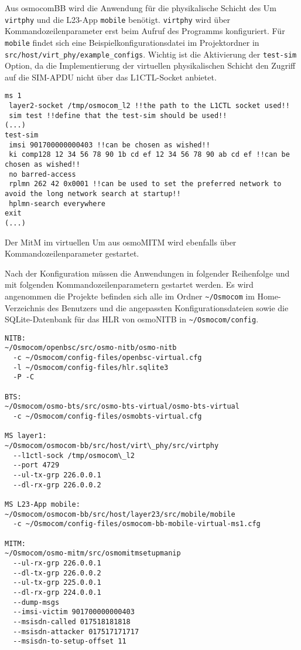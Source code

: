 Aus osmocomBB wird die Anwendung für die physikalische Schicht des \ac{Um} \texttt{virtphy} und die L23-App \texttt{mobile} benötigt. \texttt{virtphy} wird über Kommandozeilenparameter erst beim Aufruf des Programms konfiguriert. Für \texttt{mobile} findet sich eine Beispielkonfigurationsdatei im Projektordner in \texttt{src/host/virt\_phy/example\_configs}. Wichtig ist die Aktivierung der \texttt{test-sim} Option, da die Implementierung der virtuellen physikalischen Schicht den Zugriff auf die \ac{SIM}-\ac{APDU} nicht über das \ac{L1CTL}-Socket anbietet.\\

\begin{lstlisting}[boxpos=c, frame=single, language=bytetxt, numbers=none, basicstyle=\tiny\ttfamily, tabsize=1 ]
ms 1
 layer2-socket /tmp/osmocom_l2 !!the path to the L1CTL socket used!!
 sim test !!define that the test-sim should be used!!
(...)
test-sim
 imsi 901700000000403 !!can be chosen as wished!!
 ki comp128 12 34 56 78 90 1b cd ef 12 34 56 78 90 ab cd ef !!can be chosen as wished!!
 no barred-access
 rplmn 262 42 0x0001 !!can be used to set the preferred network to avoid the long network search at startup!!
 hplmn-search everywhere
exit
(...)
\end{lstlisting}

Der \ac{MitM} im virtuellen \ac{Um} aus osmoMITM wird ebenfalls über Kommandozeilenparameter gestartet.

Nach der Konfiguration müssen die Anwendungen in folgender Reihenfolge und mit folgenden Kommandozeilenparametern gestartet werden. Es wird angenommen die Projekte befinden sich alle im Ordner \texttt{\textasciitilde/Osmocom} im Home-Verzeichnis des Benutzers und die angepassten Konfigurationsdateien sowie die SQLite-Datenbank für das \ac{HLR} von osmoNITB in \texttt{\textasciitilde/Osmocom/config}.\\

\begin{lstlisting}[boxpos=c, frame=single, language=bytetxt, numbers=none, basicstyle=\footnotesize\ttfamily, tabsize=1 ]
NITB: 
~/Osmocom/openbsc/src/osmo-nitb/osmo-nitb 
  -c ~/Osmocom/config-files/openbsc-virtual.cfg
  -l ~/Osmocom/config-files/hlr.sqlite3 
  -P -C
      
BTS: 
~/Osmocom/osmo-bts/src/osmo-bts-virtual/osmo-bts-virtual 
  -c ~/Osmocom/config-files/osmobts-virtual.cfg    
      
MS layer1: 
~/Osmocom/osmocom-bb/src/host/virt\_phy/src/virtphy 
  --l1ctl-sock /tmp/osmocom\_l2 
  --port 4729 
  --ul-tx-grp 226.0.0.1 
  --dl-rx-grp 226.0.0.2

MS L23-App mobile: 
~/Osmocom/osmocom-bb/src/host/layer23/src/mobile/mobile 
  -c ~/Osmocom/config-files/osmocom-bb-mobile-virtual-ms1.cfg

MITM:
~/Osmocom/osmo-mitm/src/osmomitmsetupmanip 
  --ul-rx-grp 226.0.0.1 
  --dl-tx-grp 226.0.0.2 
  --ul-tx-grp 225.0.0.1 
  --dl-rx-grp 224.0.0.1 
  --dump-msgs 
  --imsi-victim 901700000000403 
  --msisdn-called 017518181818 
  --msisdn-attacker 017517171717 
  --msisdn-to-setup-offset 11
\end{lstlisting}

